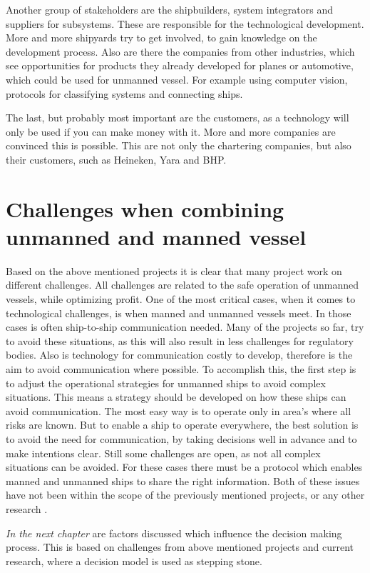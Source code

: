 Another group of stakeholders are the shipbuilders, system integrators and suppliers for subsystems. These are responsible for the technological development. More and more shipyards try to get involved, to gain knowledge on the development process. 
Also are there the companies from other industries, which see opportunities for products they already developed for planes or automotive, which could be used for unmanned vessel. For example using computer vision, protocols for classifying systems and connecting ships.

The last, but probably most important are the customers, as a technology will only be used if you can make money with it. More and more companies are convinced this is possible. This are not only the chartering companies, but also their customers, such as Heineken, Yara and BHP.

\section{Challenges when combining unmanned and manned vessel}
\label{sec:challenges-future}
Based on the above mentioned projects it is clear that many project work on different challenges. All challenges are related to the safe operation of unmanned vessels, while optimizing profit. One of the most critical cases, when it comes to technological challenges, is when manned and unmanned vessels meet. In those cases is often ship-to-ship communication needed. Many of the projects so far, try to avoid these situations, as this will also result in less challenges for regulatory bodies. Also is technology for communication costly to develop, therefore is the aim to avoid communication where possible. To accomplish this, the first step is to adjust the operational strategies for unmanned ships to avoid complex situations. This means a strategy should be developed on how these ships can avoid communication. The most easy way is to operate only in area's where all risks are known. But to enable a ship to operate everywhere, the best solution is to avoid the need for communication, by taking decisions well in advance and to make intentions clear. Still some challenges are open, as not all complex situations can be avoided. For these cases there must be a protocol which enables manned and unmanned ships to share the right information. Both of these issues have not been within the scope of the previously mentioned projects, or any other research \cite{Kooij2018}. 

\vspace{1.5cm}
\emph{In the next chapter} are factors discussed which influence the decision making process. This is based on challenges from above mentioned projects and current research, where a decision model is used as stepping stone.
















